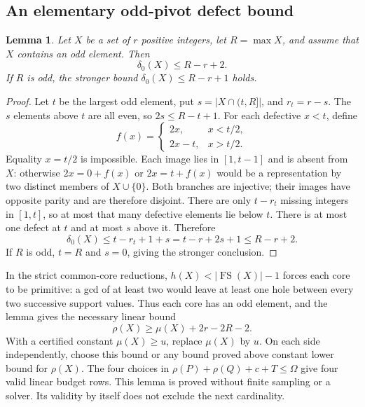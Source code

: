 \documentclass[11pt,a4paper]{article}
\newtheorem{lemma}[theorem]{Lemma}
\theoremstyle{remark}
\newcommand{\FS}{\operatorname{FS}}
\begin{document}
\subsection{An elementary odd-pivot defect bound}\label{u86:sec:odd-pivot}
\begin{lemma}\label{u86:lem:odd-pivot}
Let $X$ be a set of $r$ positive integers, let $R=\max X$, and assume
that $X$ contains an odd element. Then
\[
 \delta_0(X)\le R-r+2.
\]
If $R$ is odd, the stronger bound $\delta_0(X)\le R-r+1$ holds.
\end{lemma}
\begin{proof}
Let $t$ be the largest odd element, put $s=|X\cap(t,R]|$, and
$r_t=r-s$. The $s$ elements above $t$ are all even, so
$2s\le R-t+1$. For each defective $x<t$, define
\[
 f(x)=\begin{cases}2x,&x<t/2,\\2x-t,&x>t/2.\end{cases}
\]
Equality $x=t/2$ is impossible. Each image lies in $[1,t-1]$ and
is absent from $X$: otherwise $2x=0+f(x)$ or $2x=t+f(x)$ would be
a representation by two distinct members of $X\cup\{0\}$.
Both branches are injective; their images have opposite parity and
are therefore disjoint. There are only $t-r_t$ missing integers in
$[1,t]$, so at most that many defective elements lie below $t$.
There is at most one defect at $t$ and at most $s$ above it. Therefore
\[
 \delta_0(X)\le t-r_t+1+s=t-r+2s+1\le R-r+2.
\]
If $R$ is odd, $t=R$ and $s=0$, giving the stronger conclusion.
\end{proof}
In the strict common-core reductions, $h(X)<|\FS(X)|-1$ forces each
core to be primitive: a gcd of at least two would leave at least one
hole between every two successive support values. Thus each core has
an odd element, and the lemma gives the necessary linear bound
\begin{equation}\label{u86:eq:odd-rho}
 \rho(X)\ge\mu(X)+2r-2R-2.
\end{equation}
With a certified constant $\mu(X)\ge u$, replace $\mu(X)$ by $u$.
On each side independently, choose this bound or any bound proved above
constant lower bound for $\rho(X)$. The four choices in
$\rho(P)+\rho(Q)+c+T\le\Omega$ give four valid linear budget rows.
This lemma is proved without finite sampling or a solver. Its validity
by itself does not exclude the next cardinality.
\end{document}
